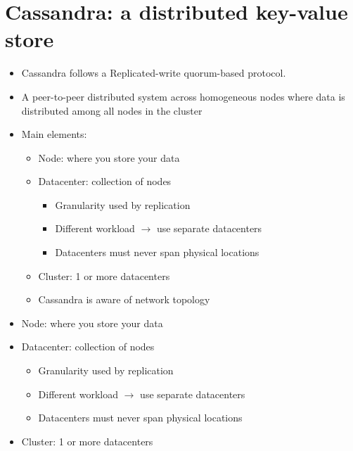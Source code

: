 \section{Cassandra: a distributed key-value store}
\begin{itemize}
\item Cassandra follows a Replicated-write quorum-based protocol.

  \item A peer-to-peer distributed system across homogeneous nodes where data is distributed among all nodes in the cluster
  \item Main elements:
  \begin{itemize}
    \item Node: where you store your data
    \item Datacenter: collection of nodes
    \begin{itemize}
      \item Granularity used by replication
      \item Different workload $\rightarrow$ use separate datacenters
      \item Datacenters must never span physical locations
    \end{itemize}
    \item Cluster: 1 or more datacenters
    \item Cassandra is aware of network topology
  \end{itemize}
\end{itemize}

\begin{itemize}
  \item Node: where you store your data
  \item Datacenter: collection of nodes
  \begin{itemize}
    \item Granularity used by replication
    \item Different workload $\rightarrow$ use separate datacenters
    \item Datacenters must never span physical locations
  \end{itemize}
  \item Cluster: 1 or more datacenters
\end{itemize}
